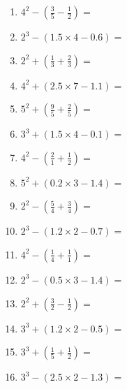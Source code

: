 \documentclass[12pt]{article}
\begin{document}
\begin{enumerate}
\item \large $ 4^{2} - (\frac{3}{5} - \frac{1}{2}) = $ \vspace{1.6cm}
\item \large $ 2^{3} - (1.5 \times 4 - 0.6) = $ \vspace{1.6cm}
\item \large $ 2^{2} + (\frac{1}{3} + \frac{2}{3}) = $ \vspace{1.6cm}
\item \large $ 4^{2} + (2.5 \times 7 - 1.1) = $ \vspace{1.6cm}
\item \large $ 5^{2} + (\frac{9}{5} + \frac{2}{5}) = $ \vspace{1.6cm}
\item \large $ 3^{3} + (1.5 \times 4 - 0.1) = $ \vspace{1.6cm}
\newpage
\item \large $ 4^{2} - (\frac{2}{1} + \frac{1}{2}) = $ \vspace{1.6cm}
\item \large $ 5^{2} + (0.2 \times 3 - 1.4) = $ \vspace{1.6cm}
\item \large $ 2^{2} - (\frac{5}{4} + \frac{3}{4}) = $ \vspace{1.6cm}
\item \large $ 2^{3} - (1.2 \times 2 - 0.7) = $ \vspace{1.6cm}
\item \large $ 4^{2} - (\frac{1}{4} + \frac{1}{1}) = $ \vspace{1.6cm}
\item \large $ 2^{3} - (0.5 \times 3 - 1.4) = $ \vspace{1.6cm}
\item \large $ 2^{2} + (\frac{3}{2} - \frac{1}{2}) = $ \vspace{1.6cm}
\item \large $ 3^{3} + (1.2 \times 2 - 0.5) = $ \vspace{1.6cm}
\item \large $ 3^{3} + (\frac{1}{5} + \frac{1}{2}) = $ \vspace{1.6cm}
\item \large $ 3^{3} - (2.5 \times 2 - 1.3) = $ \vspace{1.6cm}
\end{enumerate}\newpage
\end{document}
